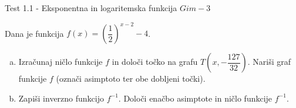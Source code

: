 \documentclass[a4paper,12pt]{letter}
\renewcommand{\headrulewidth}{3pt}
\renewcommand{\headrulewidth}{0.3pt}
\newcounter{tocke}
\begin{document}
\pagestyle{fancy}
\renewcommand\headrulewidth{0pt}
\lhead{}\chead{}\rhead{}
\rfoot{\vspace*{-2\baselineskip}}
\renewcommand{\vec}{\overrightarrow}
\def\programletnik{Gim - 3}
\def\naslov{Test 1.1 - }
\def\sklop{Eksponentna in logaritemska funkcija}
\def\tockeA{5+5}
\def\tockeB{5}
\def\tockeC{4+4}
\def\tockeD{4}
\def\tockeE{4+4}
\def\tockeF{5}
\begin{minipage}{20cm}
\begin{bclogo}[couleur=brown!30,
  arrondi=0,ombre=true, couleurOmbre=gray!50,
logo =\bcplume,
  noborder=true]
{\textrm{{\Large{\naslov \sklop} \Huge{}
\large{} \hfill $\programletnik$}}}
\end{bclogo}
\end{minipage}
\begin{minipage}{20cm}
\begin{bclogo}[couleur=brown!30,
  arrondi=0,ombre=true, couleurOmbre=gray!50,
logo =\bcplume,
  noborder=true]
{\textrm{{}}}
\end{bclogo}
\end{minipage}

\begin{naloga}[\hfill $\tockeA$] \addtocounter{tocke}{\numexpr\tockeA\relax}
Dana je funkcija $f(x)=\left(\dfrac12\right)^{x-2}-4$.
\begin{enumerate}[a)]
\item Izra\v{c}unaj ni\v{c}lo funkcije $f$ in dolo\v{c}i to\v{c}ko na grafu  $T\!\left(x,-\dfrac{127}{32}\right)$. Nari\v{s}i graf funkcije $f$ (ozna\v{c}i asimptoto ter obe dobljeni to\v{c}ki).
\item Zapi\v{s}i inverzno funkcijo $f^{-1}$. Dolo\v{c}i ena\v{c}bo asimptote in ni\v{c}lo funkcije $f^{-1}$.
\end{enumerate}

\end{naloga}
\end{document}
